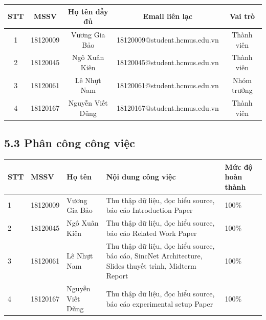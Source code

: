 \documentclass{article}
\newcommand\T{\rule{0pt}{2.6ex}}       %
\newcommand\B{\rule[-1.2ex]{0pt}{0pt}} %
\begin{document}
	\begin{center}
		\begin{tabular}{ | c | c | c | c | c |}\hline
			STT	& MSSV & Họ tên đầy đủ & Email liên lạc & Vai trò\T\B\\\hline
			1 & 18120009 & Vương Gia Bảo & 18120009@student.hcmus.edu.vn  & Thành viên \T\B\\ \hline
			2 & 18120045 & Ngô Xuân Kiên & 18120045@student.hcmus.edu.vn & Thành viên\T\B\\ \hline
			3 & 18120061 & Lê Nhựt Nam & 18120061@student.hcmus.edu.vn & Nhóm trưởng \T\B\\ \hline
			4 & 18120167 & Nguyễn Viết Dũng &  18120167@student.hcmus.edu.vn & Thành viên \T\B\\ \hline
		\end{tabular}
	\end{center}

	\subsection{5.3 Phân công công việc}
	\begin{center}
		\begin{tabular}{ | l | l | l | p{5.5cm} | p{3cm} |}
			\hline
			STT & MSSV & Họ tên & Nội dung công việc & Mức độ hoàn thành  \\ \hline
			1 & 18120009 & Vương Gia Bảo & Thu thập dữ liệu, đọc hiểu source, báo cáo Introduction Paper &  100\%\T\B\\ \hline
			2 & 18120045 & Ngô Xuân Kiên & Thu thập dữ liệu, đọc hiểu source, báo cáo Related Work Paper & 100\%\T\B \\ \hline
			3 & 18120061 & Lê Nhựt Nam & Thu thập dữ liệu, đọc hiểu source, báo cáo, SincNet Architecture, Slides thuyết trình, Midterm Report & 100\%\T\B \\ \hline
			4 & 18120167 & Nguyễn Viết Dũng &  Thu thập dữ liệu, đọc hiểu source, báo cáo experimental setup Paper & 100\%\T\B \\ \hline
		\end{tabular}
	\end{center}
	\nocite{*}
	\newpage\cleardoublepage
	
	
\end{document}
